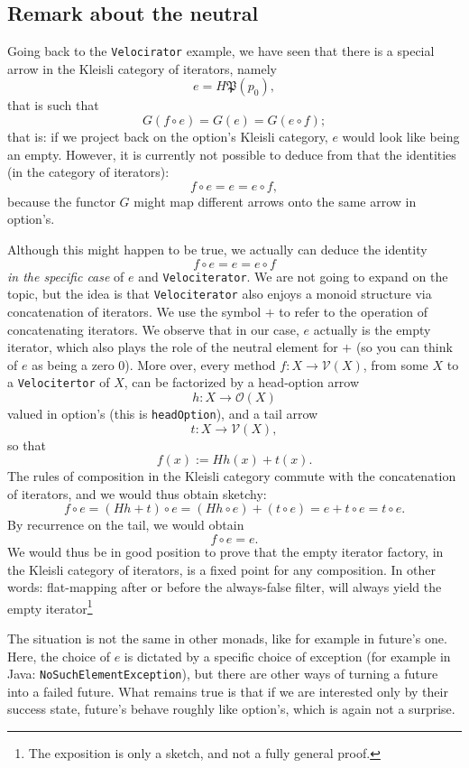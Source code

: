 \documentclass[12pt,a4paper]{report}
\theoremstyle{theorem}
\theoremstyle{definition}
\begin{document}
\subsection{Remark about the neutral}

Going back to the \lstinline{Velocirator}{} example,
we have seen that there is a special arrow in the Kleisli category
of iterators, namely
	\[ e = H\mathfrak{P}(p_0) ,\]
that is such that
	\[ G(f\circ e) = G(e) = G(e\circ f) ;\]
that is: if we project back on the option's Kleisli category,
$e$ would look like being an empty. However, it is currently not possible
to deduce from that the identities (in the category of iterators):
	\[ f\circ e = e = e\circ f, \]
because the functor $G$ might map different arrows onto the same arrow
in option's.

Although this might happen to be true, we actually can deduce
the identity
	\[ f\circ e = e = e\circ f \]
\emph{in the specific case} of $e$ and \lstinline{Velociterator}{}.
We are not going to expand on the topic, but the idea is that
\lstinline{Velociterator}{} also enjoys a monoid structure
via concatenation of iterators. We use the symbol $+$
to refer to the operation of concatenating iterators. We observe that
in our case, $e$ actually is the empty iterator, which also plays the role
of the neutral element for $+$ (so you can think of $e$ as being a zero $0$).
More over, every method $f:X\to \mathcal{V}(X)$, from some $X$
to a \lstinline{Velocitertor}{} of $X$, can be factorized by
a head-option arrow
	\[ h : X\to \mathcal{O}(X) \]
valued in option's (this is \lstinline{headOption}{}), and a tail arrow
	\[ t : X \to \mathcal{V}(X) ,\]
so that
	\[ f(x) := Hh(x) + t(x) .\]
The rules of composition in the Kleisli category commute with the concatenation
of iterators, and we would thus obtain sketchy:
	\[ f\circ e = (Hh + t)\circ e
		= (Hh \circ e) + (t\circ e) = e + t\circ e
		= t\circ e .\]
By recurrence on the tail, we would obtain
	\[ f \circ e = e. \]
We would thus be in good position to prove that the empty iterator
factory, in the Kleisli category of iterators, is a fixed point for
any composition. In other words: flat-mapping after or before
the always-false filter, will always yield the empty iterator\footnote{The
exposition is only a sketch, and not a fully general proof.}

The situation is not the same in other monads, like for example
in future's one. Here, the choice of $e$ is dictated by a specific choice
of exception (for example in Java: \lstinline{NoSuchElementException}{}),
but there are other ways of turning a future into a failed future.
What remains true is that if we are interested only by their success state,
future's behave roughly like option's, which is again not a surprise.
\end{document}
